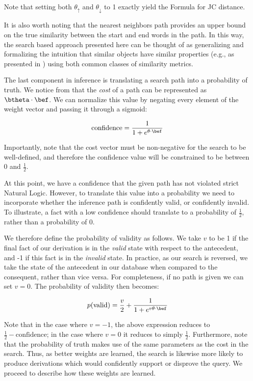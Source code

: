 Note that setting both $\theta_\uparrow$ and $\theta_\downarrow$ to 1 exactly
  yield the Formula  for JC distance.

It is also worth noting that the nearest neighbors path provides an
  upper bound on the true similarity between the start and end words
  in the path.
In this way, the search based approach presented here can be thought
  of as generalizing and formalizing the intuition that similar objects 
  have similar properties (e.g., as presented in
  ) using both common classes of similarity
  metrics.

%
%
The last component in inference is translating a search path into a
  probability of truth.
We notice from  that the \textit{cost}
  of a path can be represented as $\btheta \cdot \bef$.
We can normalize this value by negating every element of the weight
  vector and passing it through a sigmoid:

\begin{equation*}
\textrm{confidence} = \frac{1}{1 + e^{\theta \cdot \bef}}
\end{equation*}

Importantly, note that the cost vector must be non-negative for the
  search to be well-defined, and therefore the confidence value will
  be constrained to be between 0 and $\frac{1}{2}$.

At this point, we have a confidence that the given path has not violated
  strict Natural Logic.
However, to translate this value into a probability
  we need to incorporate whether the inference path is
  confidently valid, or confidently invalid.
To illustrate, a fact with a low confidence should translate to a
  probability of $\frac{1}{2}$, rather than a probability of 0.

We therefore define the probability of validity as follows.
We take $v$ to be 1 if the final fact of our derivation is in the
  \textit{valid} state with respect to the antecedent,
  and -1 if this fact is in the \textit{invalid} state.
In practice, as our search is reversed, we take the state of the
  antecedent in our database when compared to the consequent, rather
  than vice versa.
For completeness, if no path is given we can set $v=0$.
The probability of validity then becomes:

\begin{equation}
  p(\textrm{valid}) = \frac{v}{2} + \frac{1}{1 + e^{v \theta \cdot \bef}}
  \label{eqn:prob}
\end{equation}

Note that in the case where $v=-1$, the above expression reduces to
  $\frac{1}{2} - \textrm{confidence}$; in the case where $v=0$ it
  reduces to simply $\frac{1}{2}$.
Furthermore, note that the probability of truth makes use of the same
  parameters as the cost in the search.
Thus, as better weights are learned, the search is likewise more likely
  to produce derivations which would confidently support or disprove the
  query.
We proceed to describe how these weights are learned.
